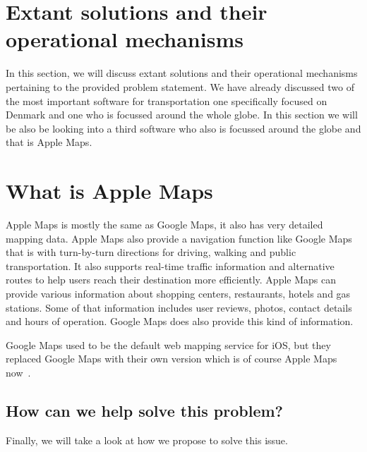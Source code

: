 \section{Extant solutions and their operational mechanisms}\label{sec:extant-solutions-and-their-operational-mechanisms}

In this section, we will discuss extant solutions and their operational mechanisms pertaining to the provided problem
statement.
We have already discussed two of the most important software for transportation one specifically focused on Denmark and
one who is focussed around the whole globe.
In this section we will be also be looking into a third software who also is focussed around the globe and that is
Apple Maps.



\section{What is Apple Maps}\label{sec:what-is-apple-maps}

Apple Maps is mostly the same as Google Maps, it also has very detailed mapping data.
Apple Maps also provide a navigation function like Google Maps that is with turn-by-turn directions for driving, walking
and public transportation.
It also supports real-time traffic information and alternative routes to help users reach their destination more
efficiently.
Apple Maps can provide various information about shopping centers, restaurants, hotels and gas stations.
Some of that information includes user reviews, photos, contact details and hours of operation.
Google Maps does also provide this kind of information.

Google Maps used to be the default web mapping service for iOS, but they replaced Google Maps with their own version
which is of course Apple Maps now~\cite{applemaps2023}.


\subsection{How can we help solve this problem?}\label{subsec:how-can-we-help-solve-this-problem?}

Finally, we will take a look at how we propose to solve this issue.

